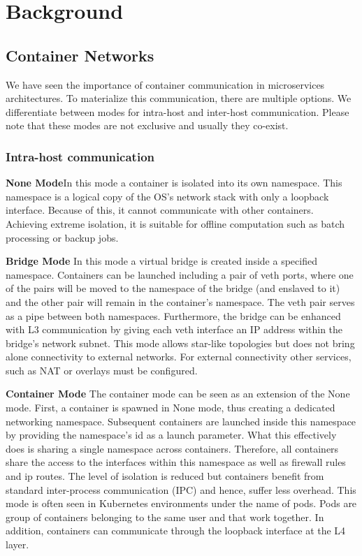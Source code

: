 \documentclass[conference]{IEEEtran}
\begin{document}
\section{Background}

\subsection{Container Networks}
We have seen the importance of container communication in microservices architectures. To materialize this communication, there are multiple options. We differentiate between modes for intra-host and inter-host communication.  Please note that these modes are not exclusive and usually they co-exist.


\subsubsection{Intra-host communication}\hfill\break
\textbf{None Mode}\hspace{0.5cm}In this mode a container is isolated into its own namespace. This namespace is a logical copy of the OS’s network stack with only a loopback interface. Because of this, it cannot communicate with other containers. Achieving extreme isolation, it is suitable for offline computation such as batch processing or backup jobs.

\noindent\textbf{Bridge Mode}\hspace{0.5cm} In this mode a virtual bridge is created inside a specified namespace. Containers can be launched including a pair of veth ports, where one of the pairs will be moved to the namespace of the bridge (and enslaved to it) and the other pair will remain in the container’s namespace. The veth pair serves as a pipe between both namespaces. Furthermore, the bridge can be enhanced with L3 communication by giving each veth interface an IP address within the bridge’s network subnet. This mode allows star-like topologies but does not bring alone connectivity to external networks. For external connectivity other services, such as NAT or overlays must be configured.

\noindent\textbf{Container Mode}\hspace{0.5cm} The container mode can be seen as an extension of the None mode. First, a container is spawned in None mode, thus creating a dedicated networking namespace. Subsequent containers are launched inside this namespace by providing the namespace’s id as a launch parameter. What this effectively does is sharing a single namespace across containers. Therefore, all containers share the access to the interfaces within this namespace as well as firewall rules and ip routes. The level of isolation is reduced but containers benefit from standard inter-process communication (IPC) and hence, suffer less overhead. This mode is often seen in Kubernetes environments under the name of pods. Pods are group of containers belonging to the same user and that work together. In addition, containers can communicate through the loopback interface at the L4 layer.
\end{document}
